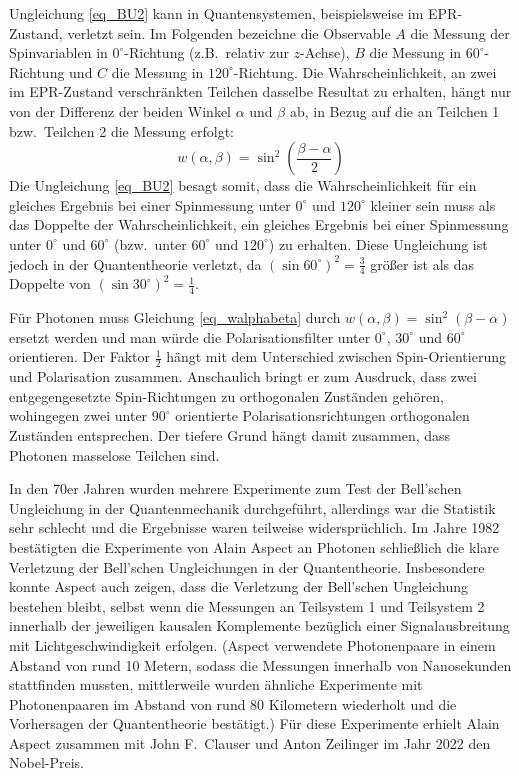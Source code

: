 Ungleichung \ref{eq_BU2} kann in Quantensystemen, beispielsweise
im EPR-Zustand, verletzt sein. 
Im Folgenden bezeichne die
Observable $A$ die Messung der Spinvariablen
in $0^\circ$-Richtung (z.B.\ relativ zur $z$-Achse),
$B$ die Messung in $60^\circ$-Richtung und
$C$ die Messung in $120^\circ$-Richtung. 
Die Wahrscheinlichkeit, an zwei
im EPR-Zustand verschr\"ankten Teilchen dasselbe
Resultat zu erhalten, h\"angt nur von der Differenz der beiden
Winkel $\alpha$ und $\beta$ ab, in Bezug auf die an Teilchen 1
bzw.\ Teilchen 2 die Messung erfolgt:
\begin{equation}
\label{eq_walphabeta}
      w(\alpha,\beta) = \sin^2 \left( \frac{\beta-\alpha}{2} \right)  
\end{equation}
Die Ungleichung \ref{eq_BU2} besagt somit, dass die Wahrscheinlichkeit
f\"ur ein gleiches Ergebnis bei einer Spinmessung unter $0^\circ$ 
und $120^\circ$ kleiner sein muss als das Doppelte der
Wahrscheinlichkeit, ein gleiches Ergebnis bei einer Spinmessung
unter $0^\circ$ und $60^\circ$ (bzw.\ unter $60^\circ$ und $120^\circ$)
zu erhalten. Diese Ungleichung ist jedoch in der Quantentheorie
verletzt, da $(\sin 60^\circ)^2 = \frac{3}{4}$ gr\"o\ss er ist als das Doppelte
von $(\sin 30^\circ)^2 = \frac{1}{4}$. 

F\"ur Photonen muss
Gleichung \ref{eq_walphabeta} durch
$w(\alpha,\beta)=\sin^2(\beta - \alpha)$ ersetzt werden
und man w\"urde die Polarisationsfilter unter $0^\circ$, $30^\circ$
und $60^\circ$ orientieren.
Der Faktor $\frac{1}{2}$ h\"angt mit
dem Unterschied zwischen Spin-Orientierung und 
Polarisation zusammen. Anschaulich bringt er zum
Ausdruck, dass zwei entgegengesetzte Spin-Richtungen
zu orthogonalen Zust\"anden geh\"oren, wohingegen
zwei unter $90^\circ$ orientierte Polarisationsrichtungen
orthogonalen Zust\"anden entsprechen. Der tiefere Grund
h\"angt damit zusammen, dass Photonen masselose Teilchen
sind.

In den 70er Jahren wurden mehrere Experimente zum
Test der Bell'schen Ungleichung in der Quantenmechanik
durchgef\"uhrt, allerdings war die Statistik sehr schlecht
und die Ergebnisse waren teilweise widerspr\"uchlich.
Im Jahre 1982 best\"atigten die Experimente von 
Alain Aspect
\cite{Aspect} an Photonen schlie\ss lich die klare Verletzung der
Bell'schen Ungleichungen in der Quantentheorie.
Insbesondere konnte 
Aspect auch zeigen, dass die Verletzung der Bell'schen
Ungleichung bestehen bleibt, selbst wenn die Messungen
an Teilsystem 1 und Teilsystem 2 innerhalb der jeweiligen
kausalen Komplemente bez\"uglich einer Signalausbreitung
mit Lichtgeschwindigkeit erfolgen. (Aspect verwendete
Photonenpaare in einem Abstand von rund 10 Metern,
sodass die Messungen innerhalb von Nanosekunden
stattfinden mussten, mittlerweile wurden \"ahnliche
Experimente mit Photonenpaaren im Abstand von rund
80 Kilometern wiederholt und die Vorhersagen der 
Quantentheorie best\"atigt.) F\"ur diese Experimente erhielt
Alain Aspect zusammen mit John F.\ Clauser und Anton Zeilinger
im Jahr 2022 den Nobel-Preis.

